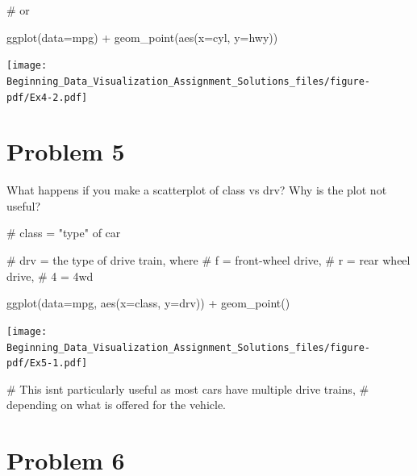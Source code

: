 \documentclass[
  letterpaper,
  DIV=11,
  numbers=noendperiod]{scrreprt}
\newenvironment{Shaded}{\begin{snugshade}}{\end{snugshade}}
\newcommand{\AttributeTok}[1]{\textcolor[rgb]{0.40,0.45,0.13}{#1}}
\newcommand{\CommentTok}[1]{\textcolor[rgb]{0.37,0.37,0.37}{#1}}
\newcommand{\FunctionTok}[1]{\textcolor[rgb]{0.28,0.35,0.67}{#1}}
\newcommand{\NormalTok}[1]{\textcolor[rgb]{0.00,0.23,0.31}{#1}}
\newcommand{\SpecialCharTok}[1]{\textcolor[rgb]{0.37,0.37,0.37}{#1}}
\begin{document}
\begin{Shaded}
\begin{Highlighting}[]
\CommentTok{\# or}

\FunctionTok{ggplot}\NormalTok{(}\AttributeTok{data=}\NormalTok{mpg) }\SpecialCharTok{+}
  \FunctionTok{geom\_point}\NormalTok{(}\FunctionTok{aes}\NormalTok{(}\AttributeTok{x=}\NormalTok{cyl, }\AttributeTok{y=}\NormalTok{hwy))}
\end{Highlighting}
\end{Shaded}

\texttt{[image: Beginning\_Data\_Visualization\_Assignment\_Solutions\_files/figure-pdf/Ex4-2.pdf]}

\section*{Problem 5}\label{problem-5-3}


What happens if you make a scatterplot of class vs drv? Why is the plot
not useful?

\begin{Shaded}
\begin{Highlighting}[]
\CommentTok{\# class = "type" of car}

\CommentTok{\# drv = the type of drive train, where }
\CommentTok{\#       f = front{-}wheel drive, }
\CommentTok{\#       r = rear wheel drive, }
\CommentTok{\#       4 = 4wd}

\FunctionTok{ggplot}\NormalTok{(}\AttributeTok{data=}\NormalTok{mpg, }\FunctionTok{aes}\NormalTok{(}\AttributeTok{x=}\NormalTok{class, }\AttributeTok{y=}\NormalTok{drv)) }\SpecialCharTok{+}
  \FunctionTok{geom\_point}\NormalTok{()}
\end{Highlighting}
\end{Shaded}

\texttt{[image: Beginning\_Data\_Visualization\_Assignment\_Solutions\_files/figure-pdf/Ex5-1.pdf]}

\begin{Shaded}
\begin{Highlighting}[]
\CommentTok{\# This isn\textquotesingle{}t particularly useful as most cars have multiple drive trains,}
\CommentTok{\# depending on what is offered for the vehicle.}
\end{Highlighting}
\end{Shaded}

\section*{Problem 6}\label{problem-6-3}
\end{document}
